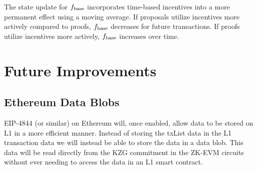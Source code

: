 \documentclass[9pt,oneside]{amsart}
\begin{document}
\begin{multicols}{2}

The state update for $f_\textnormal{base}$ incorporates time-based incentives into a more permanent effect using a moving average. If proposals utilize incentives more actively compared to proofs, $f_\textnormal{base}$ decreases for future transactions. If proofs utilize incentives more actively, $f_\textnormal{base}$ increases over time.



\label{sec:priceStateUpdate}
\color{Black}
\section{Future Improvements}\label{sec:improvements}

\subsection{Ethereum Data Blobs}\label{sec:datablobs}
EIP-4844 \cite{eip4844} (or similar) on Ethereum will, once enabled, allow data to be stored on L1 in a more efficient manner. Instead of storing the txList data in the L1 transaction data we will instead be able to store the data in a data blob. This data will be read directly from the KZG commitment in the ZK-EVM circuits without ever needing to access the data in an L1 smart contract.


\end{multicols}
\end{document}
